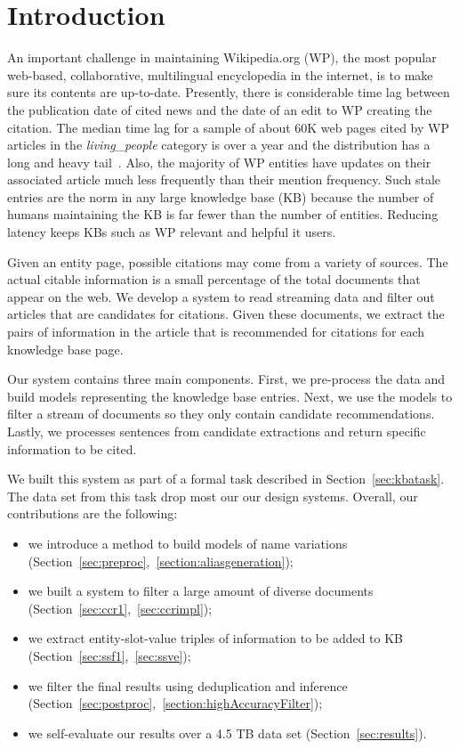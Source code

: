 
\section{Introduction}


An important challenge in maintaining Wikipedia.org (WP), the most popular 
web-based, collaborative, multilingual encyclopedia in the internet, is to 
make sure its contents are up-to-date. Presently, there is considerable time lag 
between the publication date of cited news and the date of an edit to WP 
creating the citation. The median time lag for a sample of about 60K
web pages cited by WP articles in the \textit{living\_people} category is over 
a year and the distribution has a long and heavy tail~\cite{JFrank12}. 
Also, the majority of WP entities have updates on their associated article much 
less frequently than their mention frequency. Such stale entries 
are the norm in any large knowledge base (KB) because the number of humans 
maintaining the KB is far fewer than the number of entities. 
Reducing latency keeps KBs such as WP relevant and helpful it users.

Given an entity page, possible citations may come from a variety of sources.
The actual citable information is a small percentage of the total documents that appear on the web.
We develop a system to read streaming data and filter out articles that are candidates for citations.
Given these documents, we extract the pairs of information in the 
article that is recommended for citations for each knowledge base page.

Our system contains three main components. First, we pre-process the data and
build models representing the knowledge base entries.
Next, we use the models to filter a stream of documents so they only contain 
candidate recommendations.
Lastly, we processes sentences from candidate extractions and return 
specific information to be cited.


We built this system as part of a formal task described in Section~\ref{sec:kbatask}.
The data set from this task drop most our our design systems.
Overall, our contributions are the following:
\begin{itemize}[noitemsep,nolistsep]
\item we introduce a method to build models of name variations (Section~\ref{sec:preproc},~\ref{section:aliasgeneration});
\item we built a system to filter a large amount of diverse documents (Section~\ref{sec:ccr1},~\ref{sec:ccrimpl});
\item we extract entity-slot-value triples of information to be added to KB (Section~\ref{sec:ssf1},~\ref{sec:ssve});
\item we filter the final results using deduplication and inference (Section~\ref{sec:postproc},~\ref{section:highAccuracyFilter});
\item we self-evaluate our results over a 4.5 TB data set (Section~\ref{sec:results}).
\end{itemize}



